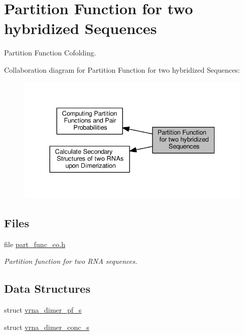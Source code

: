 \hypertarget{group__pf__cofold}{}\section{Partition Function for two hybridized Sequences}
\label{group__pf__cofold}


Partition Function Cofolding.  


Collaboration diagram for Partition Function for two hybridized Sequences\+:
\nopagebreak
\begin{figure}[H]
\begin{center}
\leavevmode
\includegraphics[width=338pt]{group__pf__cofold}
\end{center}
\end{figure}
\subsection*{Files}
\begin{DoxyCompactItemize}
\item 
file \hyperlink{part__func__co_8h}{part\+\_\+func\+\_\+co.\+h}
\begin{DoxyCompactList}\small\item\em Partition function for two R\+N\+A sequences. \end{DoxyCompactList}\end{DoxyCompactItemize}
\subsection*{Data Structures}
\begin{DoxyCompactItemize}
\item 
struct \hyperlink{group__pf__cofold_structvrna__dimer__pf__s}{vrna\+\_\+dimer\+\_\+pf\+\_\+s}
\item 
struct \hyperlink{group__pf__cofold_structvrna__dimer__conc__s}{vrna\+\_\+dimer\+\_\+conc\+\_\+s}
\end{DoxyCompactItemize}
